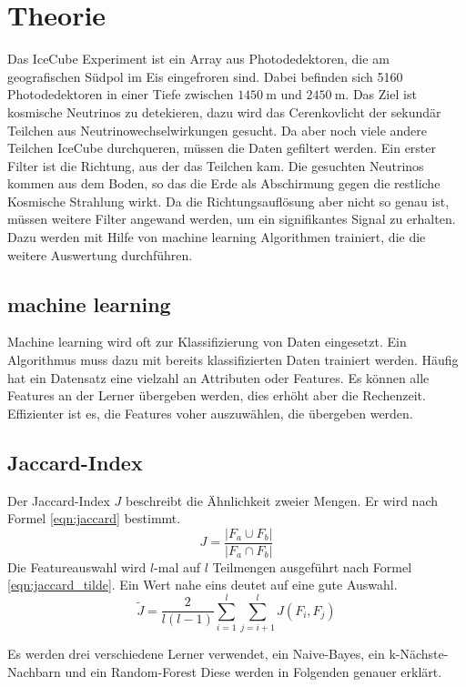 \section{Theorie}
\label{sec:Theorie}
Das IceCube Experiment ist ein Array aus Photodedektoren, die am geografischen Südpol im Eis eingefroren sind. Dabei befinden sich 5160 Photodedektoren
in einer Tiefe zwischen $\SI{1450}{\meter}$ und $\SI{2450}{\meter}$. Das Ziel ist kosmische Neutrinos zu detekieren, dazu wird das Cerenkovlicht der sekundär
Teilchen aus Neutrinowechselwirkungen gesucht. Da aber noch viele andere Teilchen IceCube durchqueren, müssen die Daten gefiltert werden. Ein erster Filter ist die
Richtung, aus der das Teilchen kam. Die gesuchten Neutrinos kommen aus dem Boden, so das die Erde als Abschirmung gegen die restliche Kosmische Strahlung
wirkt. Da die Richtungsauflösung aber nicht so genau ist, müssen weitere Filter angewand werden, um ein signifikantes Signal zu erhalten. Dazu werden mit Hilfe
von machine learning Algorithmen trainiert, die die weitere Auswertung durchführen.
\subsection{machine learning}
Machine learning wird oft zur Klassifizierung von Daten eingesetzt. Ein Algorithmus muss dazu mit bereits klassifizierten Daten trainiert werden. Häufig hat ein
Datensatz eine vielzahl an Attributen oder Features. Es können alle Features an der Lerner übergeben werden, dies erhöht aber die Rechenzeit. Effizienter ist
es, die Features voher auszuwählen, die übergeben werden.
\subsection{Jaccard-Index}
Der Jaccard-Index $J$ beschreibt die Ähnlichkeit zweier Mengen. Er wird nach Formel \eqref{eqn:jaccard} bestimmt.
\begin{equation}
	J=\frac{|F_a \cup F_b|}{|F_a \cap F_b|}
	\label{eqn:jaccard}
\end{equation}
Die Featureauswahl wird $l$-mal auf $l$ Teilmengen ausgeführt nach Formel \eqref{eqn:jaccard_tilde}. Ein Wert nahe eins deutet auf eine gute Auswahl.
\begin{equation}
	\tilde{J} =\frac{2}{l(l-1)}\sum_{i=1}^l \sum_{j=i+1}^l J(F_i,F_j)
	\label{eqn:jaccard_tilde}
\end{equation}

Es werden drei verschiedene Lerner verwendet, ein Naive-Bayes, ein  k-Nächste-Nachbarn und ein Random-Forest Diese werden in Folgenden genauer erklärt.

